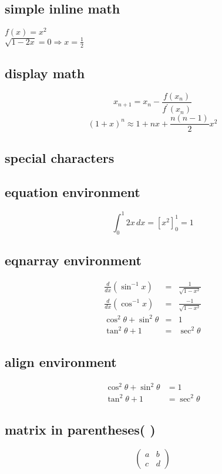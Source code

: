 \documentclass{article}
\begin{document}
\subsection{simple inline math}
$f(x)=x^2$\\
\(\sqrt{1-2x}=0 \Rightarrow x=\frac{1}{2}\)

\subsection{display math}
$$x_{n+1}=x_n -\frac{f(x_n)}{f^{'}(x_n)}$$
\[(1+x)^n\approx1+nx+\frac{n(n-1)}{2}x^2\]

\subsection{special characters}

\subsection{equation environment}
\begin{equation}
 \int_{0}^{1} 2x\,dx  =[x^2] _{0}^{1}=1
\end{equation}

\subsection{eqnarray environment}
\begin{eqnarray}
\frac{d}{dx}(\sin^{-1}x)&=&\frac{1}{\sqrt{1-x^2}}\\
\frac{d}{dx}(\cos^{-1}x)&=&\frac{-1}{\sqrt{1-x^2}}\\
\cos^{2}\theta+\sin^{2}\theta&=& 1\\
\tan^{2}\theta+1&=& \sec^{2}\theta
\end{eqnarray}

 \subsection{align environment}
\begin{align}
\cos^{2}\theta+\sin^{2}\theta&= 1\\
\tan^{2}\theta+1&= \sec^{2}\theta
\end{align}

\subsection{matrix in parentheses( )}
\begin{equation}%
\begin{pmatrix} %
a&b\\
c&d
\end{pmatrix}
\end{equation}
\end{document}
